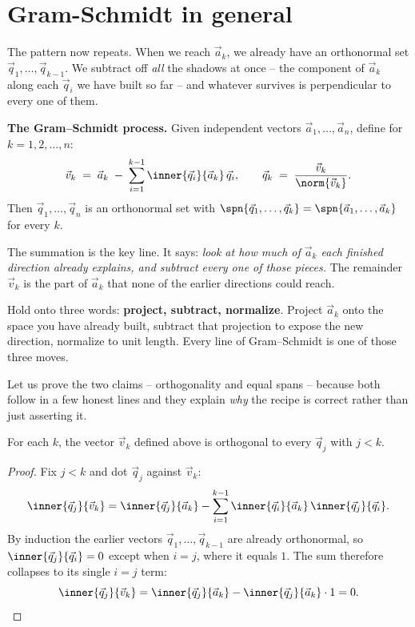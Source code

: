 \section{Gram-Schmidt in general}

The pattern now repeats. When we reach $\vec{a}_k$, we already have an orthonormal set
$\vec{q}_1,\dots,\vec{q}_{k-1}$. We subtract off \emph{all} the shadows at once -- the
component of $\vec{a}_k$ along each $\vec{q}_i$ we have built so far -- and whatever
survives is perpendicular to every one of them.

\begin{formalbox}
\textbf{The Gram--Schmidt process.} Given independent vectors
$\vec{a}_1,\dots,\vec{a}_n$, define for $k=1,2,\dots,n$:
\[
  \vec{v}_k \;=\; \vec{a}_k \;-\; \sum_{i=1}^{k-1} \inner{\vec{q}_i}{\vec{a}_k}\,\vec{q}_i,
  \qquad
  \vec{q}_k \;=\; \frac{\vec{v}_k}{\norm{\vec{v}_k}}.
\]
Then $\vec{q}_1,\dots,\vec{q}_n$ is an orthonormal set with
$\spn\{\vec{q}_1,\dots,\vec{q}_k\}=\spn\{\vec{a}_1,\dots,\vec{a}_k\}$ for every $k$.
\end{formalbox}

The summation is the key line. It says: \emph{look at how much of $\vec{a}_k$ each
finished direction already explains, and subtract every one of those pieces.} The
remainder $\vec{v}_k$ is the part of $\vec{a}_k$ that none of the earlier directions
could reach.

\begin{focusbox}
Hold onto three words: \textbf{project, subtract, normalize}. Project $\vec{a}_k$ onto
the space you have already built, subtract that projection to expose the new
direction, normalize to unit length. Every line of Gram--Schmidt is one of those three
moves.
\end{focusbox}

Let us prove the two claims -- orthogonality and equal spans -- because both follow in
a few honest lines and they explain \emph{why} the recipe is correct rather than just
asserting it.

\begin{proposition}[Orthogonality]
\label{ch20:orth-prop}
For each $k$, the vector $\vec{v}_k$ defined above is orthogonal to every
$\vec{q}_j$ with $j<k$.
\end{proposition}

\begin{proof}
Fix $j<k$ and dot $\vec{q}_j$ against $\vec{v}_k$:
\[
  \inner{\vec{q}_j}{\vec{v}_k}
   = \inner{\vec{q}_j}{\vec{a}_k}
     - \sum_{i=1}^{k-1}\inner{\vec{q}_i}{\vec{a}_k}\,\inner{\vec{q}_j}{\vec{q}_i}.
\]
By induction the earlier vectors $\vec{q}_1,\dots,\vec{q}_{k-1}$ are already
orthonormal, so $\inner{\vec{q}_j}{\vec{q}_i}=0$ except when $i=j$, where it equals
$1$. The sum therefore collapses to its single $i=j$ term:
\[
  \inner{\vec{q}_j}{\vec{v}_k}
   = \inner{\vec{q}_j}{\vec{a}_k} - \inner{\vec{q}_j}{\vec{a}_k}\cdot 1 = 0. \qedhere
\]
\end{proof}

